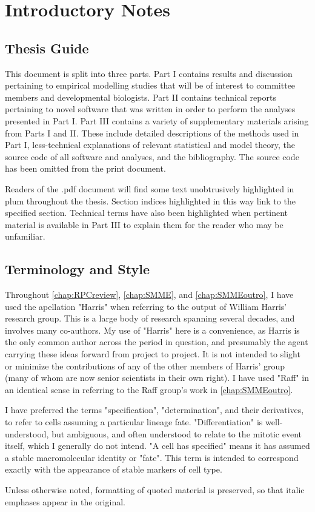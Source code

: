 \section*{Introductory Notes}
\label{ch:intro}

\subsection*{Thesis Guide}
This document is split into three parts. Part I contains results and discussion pertaining to empirical modelling studies that will be of interest to committee members and developmental biologists. Part II contains technical reports pertaining to novel software that was written in order to perform the analyses presented in Part I. Part III contains a variety of supplementary materials arising from Parts I and II. These include detailed descriptions of the methods used in Part I, less-technical explanations of relevant statistical and model theory, the source code of all software and analyses, and the bibliography. The source code has been omitted from the print document.

Readers of the .pdf document will find some text unobtrusively highlighted in plum throughout the thesis. Section indices highlighted in this way link to the specified section. Technical terms have also been highlighted when pertinent material is available in Part III to explain them for the reader who may be unfamiliar.

\subsection*{Terminology and Style}
Throughout \autoref{chap:RPCreview}, \autoref{chap:SMME}, and \autoref{chap:SMMEoutro}, I have used the apellation "Harris" when referring to the output of William Harris' research group. This is a large body of research spanning several decades, and involves many co-authors. My use of "Harris" here is a convenience, as Harris is the only common author across the period in question, and presumably the agent carrying these ideas forward from project to project. It is not intended to slight or minimize the contributions of any of the other members of Harris' group (many of whom are now senior scientists in their own right). I have used "Raff" in an identical sense in referring to the Raff group's work in \autoref{chap:SMMEoutro}.

I have preferred the terms "specification", "determination", and their derivatives, to refer to cells assuming a particular lineage fate. "Differentiation" is well-understood, but ambiguous, and often understood to relate to the mitotic event itself, which I generally do not intend. "A cell has specified" means it has assumed a stable macromolecular identity or "fate". This term is intended to correspond exactly with the appearance of stable markers of cell type.

Unless otherwise noted, formatting of quoted material is preserved, so that italic emphases appear in the original.